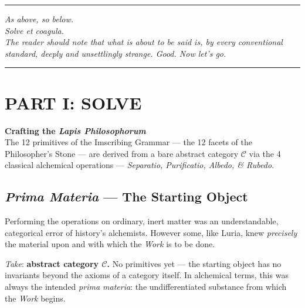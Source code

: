 \documentclass[12pt,a4paper]{article}
\begin{document}
\begin{center}
\rule{0.5\textwidth}{0.4pt}
\end{center}

\begin{center}
\emph{As above, so below.}\\[4pt]
\emph{Solve et coagula.}\\[4pt]
\emph{The reader should note that what is about to be said is, by every conventional standard, deeply and unsettlingly strange. Good. Now let's go.}
\end{center}

\begin{center}
\rule{0.5\textwidth}{0.4pt}
\end{center}

\newpage

\section*{PART I: SOLVE}\label{part:solve}

\begin{center}
\large\textbf{Crafting the \emph{Lapis Philosophorum}}\\[4pt]
\normalsize The 12 primitives of the Imscribing Grammar --- the 12 facets of the Philosopher's Stone --- are derived from a bare abstract category $\mathcal{C}$ via the 4 classical alchemical operations --- \emph{Separatio, Purificatio, Albedo, \& Rubedo}.
\end{center}

\bigskip

\subsection{\emph{Prima Materia} — The Starting Object}

Performing the operations on ordinary, inert matter was an understandable, categorical error of history's alchemists. However some, like Luria, knew \emph{precisely} the material upon and with which the \emph{Work} is to be done.

\emph{Take}: \textbf{abstract category $\mathcal{C}$.} No primitives yet --- the starting object has no invariants beyond the axioms of a category itself. In alchemical terms, this was always the intended \emph{prima materia}: the undifferentiated substance from which the \emph{Work} begins.
\end{document}
